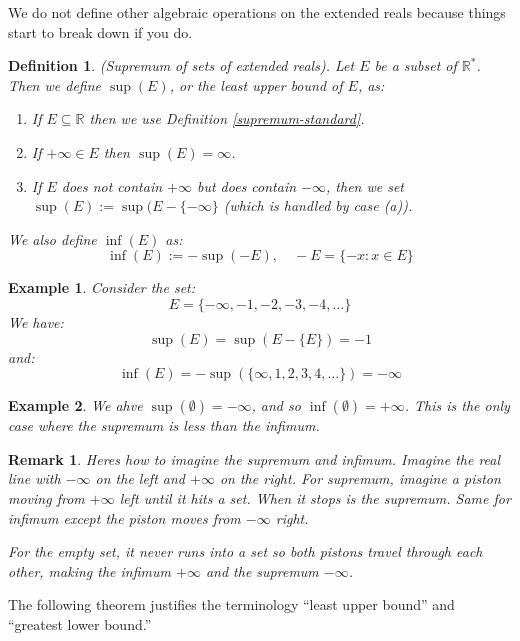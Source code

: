 \documentclass{article}
\newtheorem{example}{Example}[subsection]
\newtheorem{definition}{Definition}[subsection]
\newtheorem{remark}{Remark}[subsection]
\newcommand{\R}{\mathbb{R}}
\begin{document}
We do not define other algebraic operations
on the extended reals because things start to 
break down if you do. 

\begin{definition}
\label{supremum-extended}
	(Supremum of sets of extended reals). 
	Let $E$ be a subset of $\R^*$. Then 
	we define $\sup(E)$, or 
	the least upper bound of $E$, as:

	\begin{enumerate}[label=(\alph*)]
		\item If $E \subseteq \R$ then 
			we use Definition 
			\ref{supremum-standard}.
		\item If $+\infty  \in E$ then 
			$\sup(E) = \infty$.
		\item If $E$ does not 
			contain $+\infty$ 
			but does contain 
			$-\infty$, then 
			we set $\sup(E):=\sup(E- \{-\infty\}$
			(which is handled by case (a)).
	\end{enumerate}

	We also define $\inf(E)$ as: 
	$$
	\inf(E) := -\sup(-E),\quad -E = \{-x : x\in E \}
	$$
\end{definition}


\begin{example}
	Consider the set:
	$$
	E = \{- \infty, -1, -2, -3, -4, \dots \} 
	$$
	We have:
	$$
	\sup(E) = \sup(E - \{E\}) = -1
	$$
	and:
	$$
	\inf(E) = - \sup(\{\infty, 1,2,3,4, \dots\}) = - \infty 
	$$
\end{example}

\begin{example}
	We ahve $\sup(\emptyset) = - \infty$, and so 
	$\inf(\emptyset) = + \infty$. This is the only
	case where the supremum is less than the infimum.
\end{example}

\begin{remark}
	Heres how to imagine the supremum 
	and infimum. Imagine the real line 
	with $-\infty$ on the left and $+\infty$ 
	on the right. For supremum, imagine 
	a piston moving from $+ \infty$ left 
	until it hits a set. When it stops 
	is the supremum. Same for infimum 
	except the piston moves from 
	$- \infty$ right. 

	For the empty set, it never runs 
	into a set so both pistons travel 
	through each other, making 
	the infimum $+ \infty$ and the 
	supremum $- \infty$.
\end{remark}

The following theorem justifies the terminology 
``least upper bound'' and ``greatest lower bound.''
\end{document}
